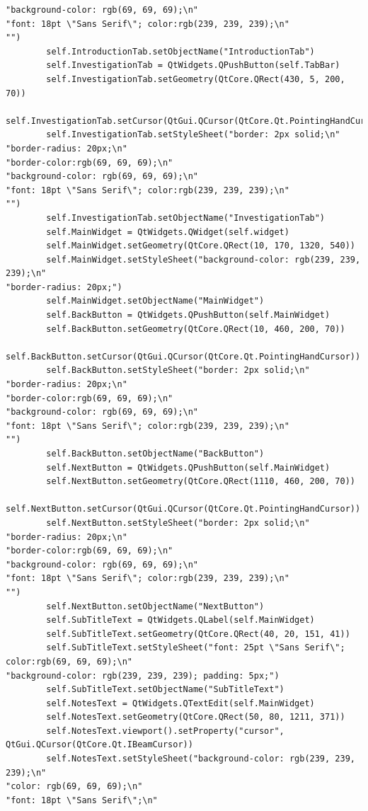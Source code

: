 \documentclass{article}
\begin{document}
\begin{lstlisting}
"background-color: rgb(69, 69, 69);\n"
"font: 18pt \"Sans Serif\"; color:rgb(239, 239, 239);\n"
"")
        self.IntroductionTab.setObjectName("IntroductionTab")
        self.InvestigationTab = QtWidgets.QPushButton(self.TabBar)
        self.InvestigationTab.setGeometry(QtCore.QRect(430, 5, 200, 70))
        self.InvestigationTab.setCursor(QtGui.QCursor(QtCore.Qt.PointingHandCursor))
        self.InvestigationTab.setStyleSheet("border: 2px solid;\n"
"border-radius: 20px;\n"
"border-color:rgb(69, 69, 69);\n"
"background-color: rgb(69, 69, 69);\n"
"font: 18pt \"Sans Serif\"; color:rgb(239, 239, 239);\n"
"")
        self.InvestigationTab.setObjectName("InvestigationTab")
        self.MainWidget = QtWidgets.QWidget(self.widget)
        self.MainWidget.setGeometry(QtCore.QRect(10, 170, 1320, 540))
        self.MainWidget.setStyleSheet("background-color: rgb(239, 239, 239);\n"
"border-radius: 20px;")
        self.MainWidget.setObjectName("MainWidget")
        self.BackButton = QtWidgets.QPushButton(self.MainWidget)
        self.BackButton.setGeometry(QtCore.QRect(10, 460, 200, 70))
        self.BackButton.setCursor(QtGui.QCursor(QtCore.Qt.PointingHandCursor))
        self.BackButton.setStyleSheet("border: 2px solid;\n"
"border-radius: 20px;\n"
"border-color:rgb(69, 69, 69);\n"
"background-color: rgb(69, 69, 69);\n"
"font: 18pt \"Sans Serif\"; color:rgb(239, 239, 239);\n"
"")
        self.BackButton.setObjectName("BackButton")
        self.NextButton = QtWidgets.QPushButton(self.MainWidget)
        self.NextButton.setGeometry(QtCore.QRect(1110, 460, 200, 70))
        self.NextButton.setCursor(QtGui.QCursor(QtCore.Qt.PointingHandCursor))
        self.NextButton.setStyleSheet("border: 2px solid;\n"
"border-radius: 20px;\n"
"border-color:rgb(69, 69, 69);\n"
"background-color: rgb(69, 69, 69);\n"
"font: 18pt \"Sans Serif\"; color:rgb(239, 239, 239);\n"
"")
        self.NextButton.setObjectName("NextButton")
        self.SubTitleText = QtWidgets.QLabel(self.MainWidget)
        self.SubTitleText.setGeometry(QtCore.QRect(40, 20, 151, 41))
        self.SubTitleText.setStyleSheet("font: 25pt \"Sans Serif\"; color:rgb(69, 69, 69);\n"
"background-color: rgb(239, 239, 239); padding: 5px;")
        self.SubTitleText.setObjectName("SubTitleText")
        self.NotesText = QtWidgets.QTextEdit(self.MainWidget)
        self.NotesText.setGeometry(QtCore.QRect(50, 80, 1211, 371))
        self.NotesText.viewport().setProperty("cursor", QtGui.QCursor(QtCore.Qt.IBeamCursor))
        self.NotesText.setStyleSheet("background-color: rgb(239, 239, 239);\n"
"color: rgb(69, 69, 69);\n"
"font: 18pt \"Sans Serif\";\n"

\end{lstlisting}
\end{document}
